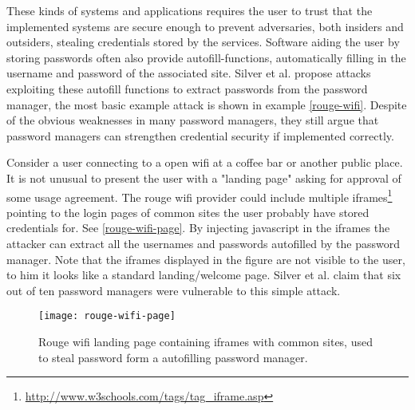 These kinds of systems and applications requires the user to trust that the implemented systems are secure enough to prevent adversaries, both insiders and outsiders, stealing credentials stored by the services. Software aiding the user by storing passwords often also provide autofill-functions, automatically filling in the username and password of the associated site. Silver et al. \cite{pw-managment-attacks} propose attacks exploiting these autofill functions to extract passwords from the password manager, the most basic example attack is shown in example \ref{rouge-wifi}. Despite of the obvious weaknesses in many password managers, they still argue that password managers can strengthen credential security if implemented correctly.  
\begin{example}\label{rouge-wifi}
    Consider a user connecting to a open wifi at a coffee bar or another public place. It is not unusual to present the user with a "landing page" asking for approval of some usage agreement. The rouge wifi provider could include multiple iframes\footnote{\url{http://www.w3schools.com/tags/tag_iframe.asp}} pointing to the login pages of common sites the user probably have stored credentials for. See \autoref{rouge-wifi-page}. By injecting javascript in the iframes the attacker can extract all the usernames and passwords autofilled by the password manager. Note that the iframes displayed in the figure are not visible to the user, to him it looks like a standard landing/welcome page. Silver et al. \cite{pw-managment-attacks} claim that six out of ten password managers were vulnerable to this simple attack.


\begin{figure}
    \texttt{[image: rouge-wifi-page]}
    \caption{Rouge wifi landing page containing iframes with common sites, used to steal password form a autofilling password manager.} 
    \label{rouge-wifi-page}
\end{figure}

\end{example}

